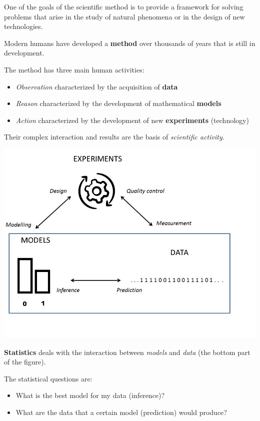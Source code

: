 \documentclass[
]{book}
\providecommand{\tightlist}{%
  \setlength{\itemsep}{0pt}\setlength{\parskip}{0pt}}
\begin{document}
One of the goals of the scientific method is to provide a framework for solving problems that arise in the study of natural phenomena or in the design of new technologies.

Modern humans have developed a \textbf{method} over thousands of years that is still in development.

The method has three main human activities:

\begin{itemize}
\tightlist
\item
  \emph{Observation} characterized by the acquisition of \textbf{data}
\item
  \emph{Reason} characterized by the development of mathematical \textbf{models}
\item
  \emph{Action} characterized by the development of new \textbf{experiments} (technology)
\end{itemize}

Their complex interaction and results are the basis of \emph{scientific activity}.

\includegraphics{./figures/stats.JPG}

\textbf{Statistics} deals with the interaction between \emph{models} and \emph{data} (the bottom part of the figure).

The statistical questions are:

\begin{itemize}
\tightlist
\item
  What is the best model for my data (inference)?
\item
  What are the data that a certain model (prediction) would produce?
\end{itemize}
\end{document}
